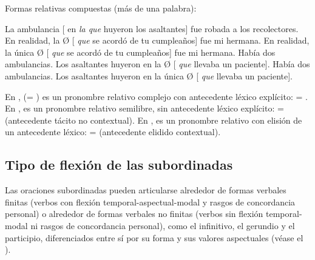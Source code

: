 \begin{recuadro}
\begin{exe}
  \ex Formas relativas compuestas (más de una palabra):
    \begin{xlist}
      \ex\label{ex:13-compuestas-a} La ambulancia [ en \textit{la que}
          huyeron los asaltantes] fue robada a los recolectores.
      \ex\label{ex:13-compuestas-c} En realidad, la Ø [ \textit{que} se
          acordó de tu cumpleaños] fue mi hermana.
      \ex\label{ex:13-compuestas-d} En realidad, la única Ø [
          \textit{que} se acordó de tu cumpleaños] fue mi hermana.
      \ex\label{ex:13-compuestas-e} Había dos ambulancias. Los asaltantes
          huyeron en la Ø [ \textit{que} llevaba un paciente].
      \ex\label{ex:13-compuestas-f} Había dos ambulancias. Los asaltantes
          huyeron en la única Ø [ \textit{que} llevaba un paciente].
    \end{xlist}
\end{exe}

En ,  (= ) es un pronombre
relativo complejo con antecedente léxico explícito:  = . En
,  es un pronombre relativo semilibre,
sin antecedente léxico explícito:  =  (antecedente tácito no contextual). En
,  es un pronombre relativo con elisión
de un antecedente léxico:  =  (antecedente elidido contextual).
\end{recuadro}

\subsection{Tipo de flexión de las subordinadas}\label{sec:13-flexion}

Las oraciones subordinadas pueden articularse alrededor de formas verbales
finitas (verbos con flexión temporal-aspectual-modal y rasgos de concordancia
personal) o alrededor de formas verbales no finitas (verbos sin flexión
temporal-modal ni rasgos de concordancia personal), como el infinitivo, el
gerundio y el participio, diferenciados entre sí por su forma y sus valores
aspectuales (véase el ).

